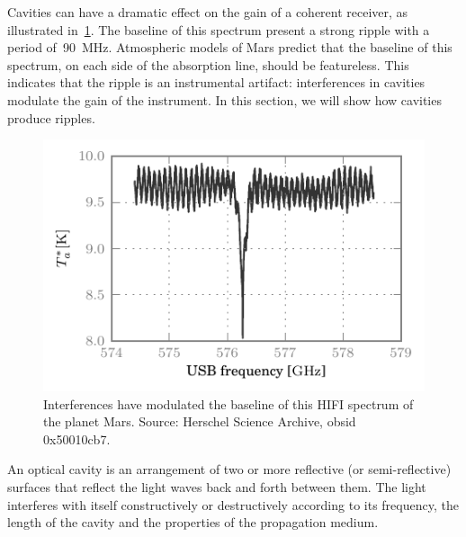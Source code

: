 \begin{refsection}
Cavities can have a dramatic effect on the gain of a coherent receiver, as illustrated in~\cref{fig:mars_50010cb7_WBSH_USB_chp2}.
The baseline of this spectrum present a strong ripple with a period of~\SI{90}{\mega\hertz}.
Atmospheric models of Mars predict that the baseline of this spectrum, on each side of the absorption line, should be featureless.
This indicates that the ripple is an instrumental artifact: interferences in cavities modulate the gain of the instrument.
In this section, we will show how cavities produce ripples.
\begin{figure}
    \centering
    \includegraphics[width=\textwidth]{mars_50010cb7_WBSH_USB}
    \caption{Interferences have modulated the baseline of this HIFI spectrum of the planet Mars.
        Source: Herschel Science Archive, obsid 0x50010cb7.
    }
    \label{fig:mars_50010cb7_WBSH_USB_chp2}
\end{figure}

An optical cavity is an arrangement of two or more reflective (or semi-reflective) surfaces that reflect the light waves back and forth between them.
The light interferes with itself constructively or destructively according to its frequency, the length of the cavity and the properties of the propagation medium.


\end{refsection}
